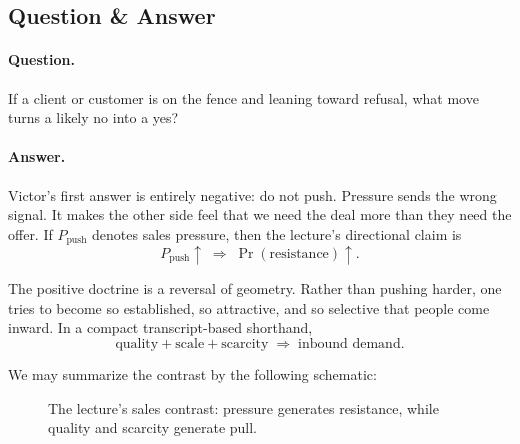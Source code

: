 \subsection{Question \& Answer}

\paragraph{Question.}
If a client or customer is on the fence and leaning toward refusal, what move turns a likely no into a yes?

\paragraph{Answer.}
Victor's first answer is entirely negative: do not push. Pressure sends the wrong signal. It makes the other side feel that we need the deal more than they need the offer. If \(P_{\text{push}}\) denotes sales pressure, then the lecture's directional claim is
\begin{equation}
P_{\text{push}} \uparrow \;\Rightarrow\; \Pr(\text{resistance}) \uparrow.
\end{equation}

The positive doctrine is a reversal of geometry. Rather than pushing harder, one tries to become so established, so attractive, and so selective that people come inward. In a compact transcript-based shorthand,
\begin{equation}
\text{quality} + \text{scale} + \text{scarcity} \;\Rightarrow\; \text{inbound demand}.
\end{equation}

We may summarize the contrast by the following schematic:

\begin{figure}
\centering
{}
\caption{The lecture's sales contrast: pressure generates resistance, while quality and scarcity generate pull.}
\end{figure}

